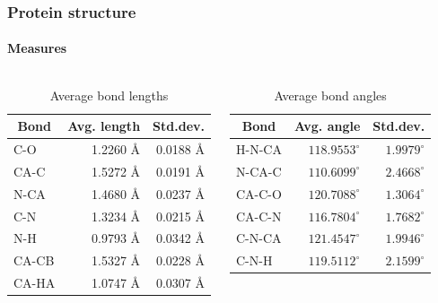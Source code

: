 \documentclass{beamer}
\begin{document}
\begin{frame}[t, fragile]
  \frametitle{Protein structure}
  \framesubtitle{Measures}
\vspace{-0.5cm}
  \begin{columns}
 \column{5.5cm}
\begin{table}
  \centering
  \begin{tabular}{lrr}
    \toprule
    \multicolumn{1}{c}{Bond} & \multicolumn{1}{c}{Avg. length} & \multicolumn{1}{c}{Std.dev.} \\ \midrule 
    C-O   & 1.2260 Å & 0.0188 Å\\
    CA-C  & 1.5272 Å & 0.0191 Å\\
    N-CA  & 1.4680 Å & 0.0237 Å\\
    C-N   & 1.3234 Å & 0.0215 Å\\
    N-H   & 0.9793 Å & 0.0342 Å\\
    CA-CB & 1.5327 Å & 0.0228 Å\\
    CA-HA & 1.0747 Å & 0.0307 Å\\ \bottomrule
  \end{tabular}
  \vspace{1mm}
  \caption{Average bond lengths}
  \label{tab:average_bond_lengths}
\end{table}

\column{5.5cm}
\begin{table}
  \centering
  \begin{tabular}{lrr}
    \toprule
    \multicolumn{1}{c}{Bond} & \multicolumn{1}{c}{Avg. angle} & \multicolumn{1}{c}{Std.dev.} \\ \midrule 
    H-N-CA & $118.9553^\circ$ & $1.9979^\circ$\\
    N-CA-C & $110.6099^\circ$ & $2.4668^\circ$\\
    CA-C-O & $120.7088^\circ$ & $1.3064^\circ$\\
    CA-C-N & $116.7804^\circ$ & $1.7682^\circ$\\
    C-N-CA & $121.4547^\circ$ & $1.9946^\circ$\\
    C-N-H  & $119.5112^\circ$ & $2.1599^\circ$\\ \bottomrule
  \end{tabular}
  \vspace{1mm}
  \caption{Average bond angles}
  \label{tab:average_bond_angles}
\end{table}

\end{columns}
\end{frame}
\end{document}
